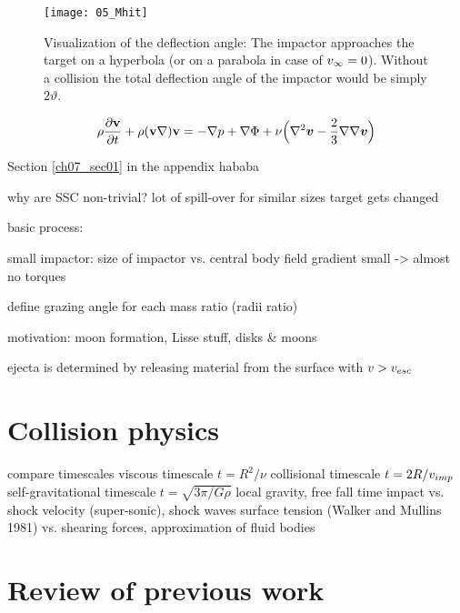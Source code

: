 \begin{figure}[htbp]
\begin{center}
\texttt{[image: 05\_Mhit]}
\caption{Visualization of the deflection angle: The impactor approaches the target on a hyperbola (or on a parabola in case of $v_{\infty} = 0$). Without a collision the total deflection angle of the impactor would be simply $2 \vartheta$.}
\label{ch03_fig02}
\end{center}
\end{figure}


\begin{equation}
\label{ch03_fld01_eq002}
\rho \frac{\partial \mathbf{v}}{\partial t} + \rho ( \mathbf{v} \nabla ) \mathbf{v} = - \nabla p + \nabla \Phi + \nu \Big( \nabla^2 \boldsymbol{v} - \frac{2}{3} \nabla \nabla \boldsymbol{v} \Big)
\end{equation}

Section \ref{ch07_sec01} in the appendix hababa



why are SSC non-trivial?
lot of spill-over for similar sizes
target gets changed

basic process: 

small impactor: size of impactor vs. central body field gradient small -> almost no torques

define grazing angle for each mass ratio (radii ratio)

motivation: moon formation, Lisse stuff, disks \& moons

ejecta is determined by releasing material from the surface with $v > v_{esc}$


\section{Collision physics}
compare timescales
viscous timescale $t = R^2 / \nu$
collisional timescale $t = 2 R / v_{imp}$
self-gravitational timescale $t = \sqrt{3\pi / G \rho}$
local gravity, free fall time
impact vs. shock velocity (super-sonic), shock waves
surface tension (Walker and Mullins 1981) vs. shearing forces, approximation of fluid bodies

\section{Review of previous work}


